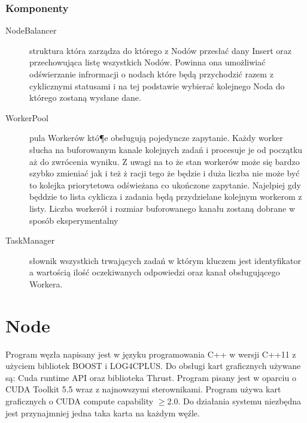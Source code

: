 \documentclass[paper=a4, fontsize=11pt]{scrartcl} %
\numberwithin{equation}{section} %
\numberwithin{figure}{section} %
\numberwithin{table}{section} %
\begin{document}
	\subsubsection{Komponenty}
		\begin{description}
		    \item[NodeBalancer] struktura która zarządza do którego z Nodów przesłać dany Insert oraz przechowująca listę wszystkich Nodów.
		    Powinna ona umożliwiać odświerzanie infrormacji o nodach które będą przychodzić razem z cyklicznymi statusami i na tej podstawie
		    wybierać kolejnego Noda do którego zostaną wysłane dane. 
		    \item[WorkerPool] pula Workerów któ¶e obsługują pojedyncze zapytanie. Każdy worker słucha na buforowanym kanale kolejnych zadań i 
		    procesuje je od początku aż do zwrócenia wyniku. Z uwagi na to że stan workerów może się bardzo szybko zmieniać jak i też ż racji tego
		    że będzie i duża liczba nie może być to kolejka priorytetowa odświeżana co ukończone zapytanie. Najelpiej gdy będdzie to lista cyklicza
		    i zadania będą przydzielane kolejnym workerom z listy. Liczba workerół i rozmiar buforowanego kanału zostaną dobrane w sposób eksperymentalny
		    \item[TaskManager] słownik wszystkich trwających zadań w którym kluczem jest identyfikator a wartością ilość oczekiwanych odpowiedzi 
		    oraz kanał obsługującego  Workera.
		\end{description}					

\section{Node}
	Program węzła napisany jest w języku programowania C++ w wersji C++11 z użyciem bibliotek BOOST i LOG4CPLUS. Do obsługi kart 
	graficznych używane są: Cuda runtime API oraz biblioteka Thrust. Program pisany jest w oparciu o CUDA Toolkit 5.5 wraz z najnowszymi sterownikami. 
	Program używa kart graficznych o CUDA compute capability $\geq 2.0$. Do działania systemu niezbędna jest przynajmniej jedna taka karta na każdym węźle.   
\end{document}
